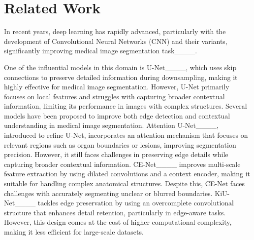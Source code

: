 \section{Related Work}
In recent years, deep learning has rapidly advanced, particularly with the development of Convolutional Neural Networks (CNN) and their variants, significantly improving medical image segmentation task____. 

 One of the influential models in this domain is U-Net____, which uses skip connections to preserve detailed information during downsampling, making it highly effective for medical image segmentation. However, U-Net primarily focuses on local features and struggles with capturing broader contextual information, limiting its performance in images with complex structures. Several models have been proposed to improve both edge detection and contextual understanding in medical image segmentation. Attention U-Net____, introduced to refine U-Net, incorporates an attention mechanism that focuses on relevant regions such as organ boundaries or lesions, improving segmentation precision. However, it still faces challenges in preserving edge details while capturing broader contextual information. CE-Net____ improves multi-scale feature extraction by using dilated convolutions and a context encoder, making it suitable for handling complex anatomical structures. Despite this, CE-Net faces challenges with accurately segmenting unclear or blurred boundaries. KiU-Net____ tackles edge preservation by using an overcomplete convolutional structure that enhances detail retention, particularly in edge-aware tasks. However, this design comes at the cost of higher computational complexity, making it less efficient for large-scale datasets.
